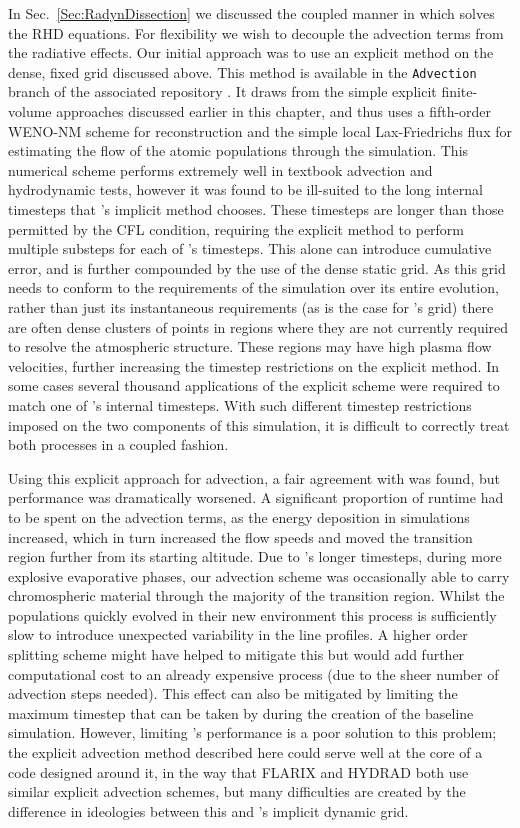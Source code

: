 In Sec.~\ref{Sec:RadynDissection} we discussed the coupled manner in which \Radyn{} solves the RHD equations.
For flexibility we wish to decouple the advection terms from the radiative effects.
Our initial approach was to use an explicit method on the dense, fixed grid discussed above.
This method is available in the \texttt{Advection} branch of the associated repository \NeedRef{}.
It draws from the simple explicit finite-volume approaches discussed earlier in this chapter, and thus uses a fifth-order WENO-NM scheme for reconstruction and the simple local Lax-Friedrichs flux for estimating the flow of the atomic populations through the simulation.
This numerical scheme performs extremely well in textbook advection and hydrodynamic tests, however it was found to be ill-suited to the long internal timesteps that \Radyn{}'s implicit method chooses.
These timesteps are longer than those permitted by the CFL condition, requiring the explicit method to perform multiple substeps for each of \Radyn{}'s timesteps.
This alone can introduce cumulative error, and is further compounded by the use of the dense static grid.
As this grid needs to conform to the requirements of the simulation over its entire evolution, rather than just its instantaneous requirements (as is the case for \Radyn{}'s grid) there are often dense clusters of points in regions where they are not currently required to resolve the atmospheric structure.
These regions may have high plasma flow velocities, further increasing the timestep restrictions on the explicit method.
In some cases several thousand applications of the explicit scheme were required to match one of \Radyn{}'s internal timesteps.
With such different timestep restrictions imposed on the two components of this simulation, it is difficult to correctly treat both processes in a coupled fashion.

Using this explicit approach for advection, a fair agreement with \Radyn{} was found, but performance was dramatically worsened.
A significant proportion of runtime had to be spent on the advection terms, as the energy deposition in simulations increased, which in turn increased the flow speeds and moved the transition region further from its starting altitude.
Due to \Radyn{}'s longer timesteps, during more explosive evaporative phases, our advection scheme was occasionally able to carry chromospheric material through the majority of the transition region.
Whilst the populations quickly evolved in their new environment this process is sufficiently slow to introduce unexpected variability in the line profiles.
A higher order splitting scheme might have helped to mitigate this but would add further computational cost to an already expensive process (due to the sheer number of advection steps needed).
This effect can also be mitigated by limiting the maximum timestep that can be taken by \Radyn{} during the creation of the baseline simulation.
However, limiting \Radyn{}'s performance is a poor solution to this problem; the explicit advection method described here could serve well at the core of a code designed around it, in the way that FLARIX and HYDRAD both use similar explicit advection schemes, but many difficulties are created by the difference in ideologies between this and \Radyn{}'s implicit dynamic grid.

